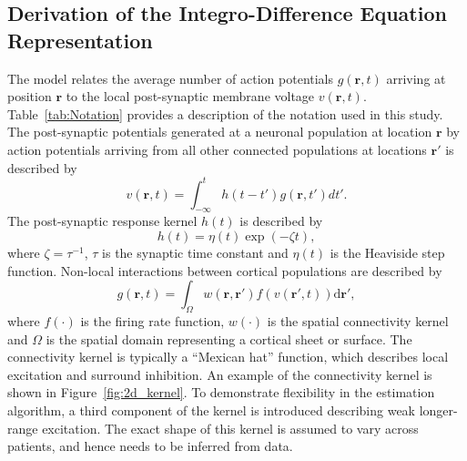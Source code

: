 \documentclass[10pt]{article}
\begin{document}
\subsection*{Derivation of the Integro-Difference Equation Representation}
The model relates the average number of action potentials $g(\mathbf{r},t)$ arriving at position $\mathbf{r}$ to the local post-synaptic membrane voltage $v(\mathbf{r},t)$. Table~\ref{tab:Notation} provides a description of the notation used in this study. The post-synaptic potentials generated at a neuronal population at location $\mathbf{r}$ by action potentials arriving from all other connected populations at locations $\mathbf{r}'$ is described by 
\begin{equation}
	\label{SpikesToPotential} v\left( {\mathbf{r},t} \right) = \int_{ - \infty }^t {h\left( {t - t'} \right)g\left( {\mathbf{r},t'} \right)dt'}. 
\end{equation}
The post-synaptic response kernel $h(t)$ is described by 
\begin{equation}
	\label{SynapticRespKernel} h(t) = \eta(t)\exp{\left(-\zeta t\right)}, 
\end{equation}
where $\zeta=\tau^{-1}$, $\tau$ is the synaptic time constant and $\eta(t)$ is the Heaviside step function. Non-local interactions between cortical populations are described by 
\begin{equation}
	\label{RateBasedInteractions} g\left( \mathbf{r},t \right) = \int_\Omega {w\left( \mathbf{r},\mathbf{r}' \right)f\left( v\left( \mathbf{r}',t \right) \right)\textrm{d}\mathbf{r}'}, 
\end{equation}
where $f(\cdot)$ is the firing rate function, $w(\cdot)$ is the spatial connectivity kernel and $\Omega$ is the spatial domain representing a cortical sheet or surface. The connectivity kernel is typically a ``Mexican hat'' function, which describes local excitation and surround inhibition. An example of the connectivity kernel is shown in Figure~\ref{fig:2d_kernel}. To demonstrate flexibility in the estimation algorithm, a third component of the kernel is introduced describing weak longer-range excitation. The exact shape of this kernel is assumed to vary across patients, and hence needs to be inferred from data.
\end{document}

